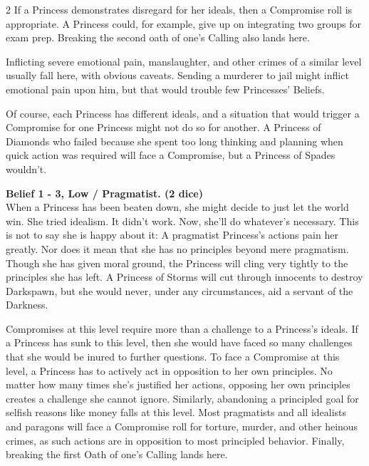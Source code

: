 \begin{multicols}{2}
If a Princess demonstrates disregard for her ideals, then a Compromise roll is appropriate. A Princess could, for example, give up on integrating two groups for exam prep. Breaking the second oath of one's Calling also lands here. 

Inflicting severe emotional pain, manslaughter, and other crimes of a similar level usually fall here, with obvious caveats. Sending a murderer to jail might inflict emotional pain upon him, but that would trouble few Princesses' Beliefs. 

Of course, each Princess has different ideals, and a situation that would trigger a Compromise for one Princess might not do so for another. A Princess of Diamonds who failed because she spent too long thinking and planning when quick action was required will face a Compromise, but a Princess of Spades wouldn't. 


\noindent\textbf{Belief 1 - 3, Low / Pragmatist. (2 dice)}\\

\noindent When a Princess has been beaten down, she might decide to just let the world win. She tried idealism. It didn't work. Now, she'll do whatever's necessary. This is not to say she is happy about it: A pragmatist Princess's actions pain her greatly. Nor does it mean that she has no principles beyond mere pragmatism. Though she has given moral ground, the Princess will cling very tightly to the principles she has left. A Princess of Storms will cut through innocents to destroy Darkspawn, but she would never, under any circumstances, aid a servant of the Darkness.

Compromises at this level require more than a challenge to a Princess's ideals. If a Princess has sunk to this level, then she would have faced so many challenges that she would be inured to further questions. To face a Compromise at this level, a Princess has to actively act in opposition to her own principles. No matter how many times she's justified her actions, opposing her own principles creates a challenge she cannot ignore. Similarly, abandoning a principled goal for selfish reasons like money falls at this level. Most pragmatists and all idealists and paragons will face a Compromise roll for torture, murder, and other heinous crimes, as such actions are in opposition to most principled behavior. Finally, breaking the first Oath of one's Calling lands here. 


\end{multicols}
